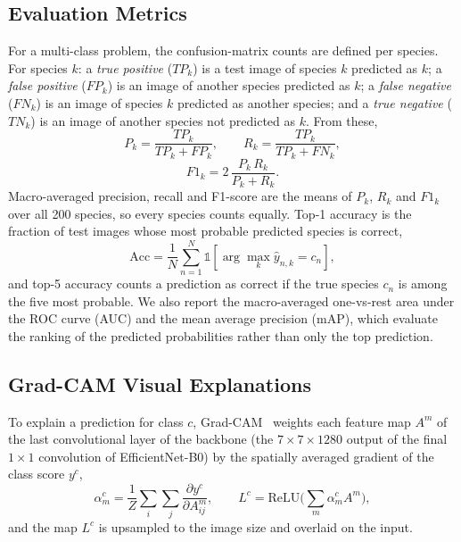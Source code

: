 \documentclass[conference]{IEEEtran}
\begin{document}
\subsection{Evaluation Metrics}
For a multi-class problem, the confusion-matrix counts are defined per species.
For species $k$: a \emph{true positive} ($TP_k$) is a test image of species $k$
predicted as $k$; a \emph{false positive} ($FP_k$) is an image of another species
predicted as $k$; a \emph{false negative} ($FN_k$) is an image of species $k$
predicted as another species; and a \emph{true negative} ($TN_k$) is an image of
another species not predicted as $k$. From these,
\begin{equation}
P_k = \frac{TP_k}{TP_k+FP_k},\qquad R_k = \frac{TP_k}{TP_k+FN_k},
\end{equation}
\begin{equation}
F1_k = 2\,\frac{P_k\,R_k}{P_k+R_k}.
\end{equation}
Macro-averaged precision, recall and F1-score are the means of $P_k$, $R_k$ and
$F1_k$ over all 200 species, so every species counts equally. Top-1 accuracy is
the fraction of test images whose most probable predicted species is correct,
\begin{equation}
\text{Acc} = \frac{1}{N}\sum_{n=1}^{N}\mathbb{1}\left[\arg\max_k \hat{y}_{n,k} = c_n\right],
\end{equation}
and top-5 accuracy counts a prediction as correct if the true species $c_n$ is among
the five most probable. We also report the macro-averaged one-vs-rest area
under the ROC curve (AUC) and the mean average precision (mAP), which evaluate the
ranking of the predicted probabilities rather than only the top prediction.

\subsection{Grad-CAM Visual Explanations}
To explain a prediction for class $c$, Grad-CAM~\cite{selvaraju2017} weights each
feature map $A^m$ of the last convolutional layer of the backbone (the
$7\times7\times1280$ output of the final $1\times1$ convolution of
EfficientNet-B0) by the spatially averaged gradient of the class score $y^c$,
\begin{equation}
\alpha_m^c = \frac{1}{Z}\sum_{i}\sum_{j}\frac{\partial y^c}{\partial A^m_{ij}},
\qquad
L^c = \mathrm{ReLU}\Big(\sum_m \alpha_m^c A^m\Big),
\end{equation}
and the map $L^c$ is upsampled to the image size and overlaid on the input.
\end{document}
